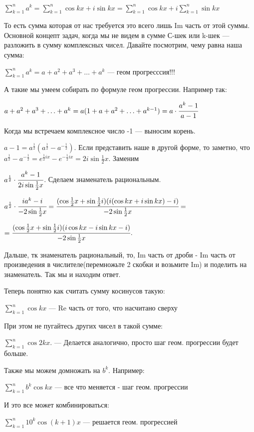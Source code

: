 \documentclass{article}
\begin{document}
$\sum\limits_{k=1}^n a^k = \sum\limits_{k=1}^n  \cos kx  + i\sin kx = \sum\limits_{k=1}^n \cos kx + i\sum\limits_{k=1}^n \sin kx$

То есть сумма которая от нас требуется это всего лишь Im часть от этой суммы. Основной концепт задач, когда мы не видем в сумме С-шек или k-шек --- разложить в сумму комплексных чисел. Давайте посмотрим, чему равна наша сумма:

$\sum\limits_{k=1}^n a^k = a + a^2 + a^3 +\ldots + a^k$ --- геом прогресссия!!!

А такие мы умеем собирать по формуле геом прогрессии. Например так:

$a + a^2 + a^3 +\ldots + a^k = a (1 + a + a^2 + \ldots + a^{k-1}) = a\cdot\cfrac{a^{k}-1}{a-1}$

Когда мы встречаем комплексное число -1 --- выносим корень.

$a-1 = a^{\frac{1}{2}}(a^{\frac{1}{2}} - a^{-\frac{1}{2}})$. Если представить наше в другой форме, то заметно, что $a^{\frac{1}{2}} - a^{-\frac{1}{2}} = e^{\frac{1}{2}ix}-e^{-\frac{1}{2}ix} = 2i \sin \frac{1}{2}x$. Заменим

$a^{\frac{1}{2}}\cdot\cfrac{a^{k}-1}{2i \sin \frac{1}{2}x}$. Сделаем знаменатель рациональным. 

$a^{\frac{1}{2}}\cdot\cfrac{ia^{k}-i}{-2 \sin \frac{1}{2}x} = \cfrac{(\cos \frac{1}{2}x + \sin \frac{1}{2}i)(i(\cos kx + i\sin kx) -i)}{-2 \sin \frac{1}{2}x}=$

$=\cfrac{(\cos \frac{1}{2}x + \sin \frac{1}{2}i)(i\cos kx - i\sin kx -i)}{-2 \sin \frac{1}{2}x} $.

Дальше, тк знаменатель рациональный, то, Im часть от дроби - Im часть от произведения в числителе(перемножьте 2 скобки и возьмите Im) и поделить на знаменатель. Так мы и находим ответ.

Теперь понятно как считать сумму косинусов такую:

$\sum\limits_{k=1}^n \cos kx$ --- Re часть от того, что насчитано сверху

При этом не пугайтесь других чисел в такой сумме:

$\sum\limits_{k=1}^n \cos 2kx$. --- Делается аналогично, просто шаг геом. прогрессии будет больше.

Также мы можем домножать на $b^k$. Например:

$\sum\limits_{k=1}^n b^k\cos kx$ --- все что меняется - шаг геом. прогрессии

И это все может комбинироваться:


$\sum\limits_{k=1}^n 10^k\cos (k+1)x$ --- решается геом. прогрессией
\end{document}
